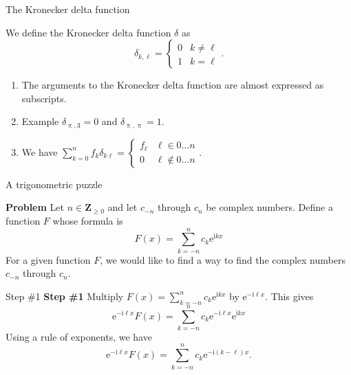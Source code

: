 \documentclass[portrait,fleqn,12pt]{beamer}
\newcommand{\integers}{\mathbf{Z}}
\newcommand{\euler}{\mathrm{e}}
\newcommand{\imag}{\mathrm{i}}
\newenvironment{handlist}
   {\begin{enumerate}[\faHandPointRight]
       \addtolength{\itemsep}{0.0\itemsep}}
     {\end{enumerate}}
\begin{document}
\begin{frame}{The  Kronecker delta function}

We define the Kronecker delta function $\delta$ as
\begin{equation*}
   \delta_{k, \ell} = \begin{cases} 0 & k \neq \ell \\ 1 & k= \ell \end{cases}.
\end{equation*}

\begin{handlist}
\item The arguments to the Kronecker delta function are almost expressed as subscripts.

\item Example $\delta_{\uppi, 3} = 0$ and $\delta_{\uppi, \uppi} = 1$.

\item We have $\sum_{k=0}^n f_k \delta_{k\ell} = \begin{cases} f_\ell &  \ell \in 0 \dots n \\ 0 & \ell \notin 0 \dots n  \end{cases}$.
\end{handlist}
\end{frame}


\begin{frame}{A trigonometric puzzle}

\textbf{Problem} Let $n \in \integers_{\geq 0}$ and let $c_{-n}$ through $c_n$ be complex numbers. Define a 
function $F$ whose formula is 
\begin{equation*}
    F(x) = \sum_{k=-n}^n c_k \euler^{\imag  k x}
\end{equation*}
For a given function $F$, we would like to find a way to find the complex numbers $c_{-n}$ through $c_n$.

\end{frame}

\begin{frame}{Step \#1}
\textbf{Step \#1} Multiply $\displaystyle F(x) = \sum_{k=-n}^n c_k \euler^{\imag  k x}$  by $\euler^{-\imag  \ell x}$. This 
gives
\begin{equation}
    \euler^{-\imag  \ell x} F(x) = \sum_{k=-n}^n c_k 
    \euler^{-\imag  \ell x} \euler^{\imag  k x}
\end{equation}
Using a rule of exponents, we have
\begin{equation}
    \euler^{-\imag  \ell x} F(x) = \sum_{k=-n}^n c_k 
    \euler^{-\imag  (k - \ell) x}.
\end{equation}
\end{frame}
\end{document}
